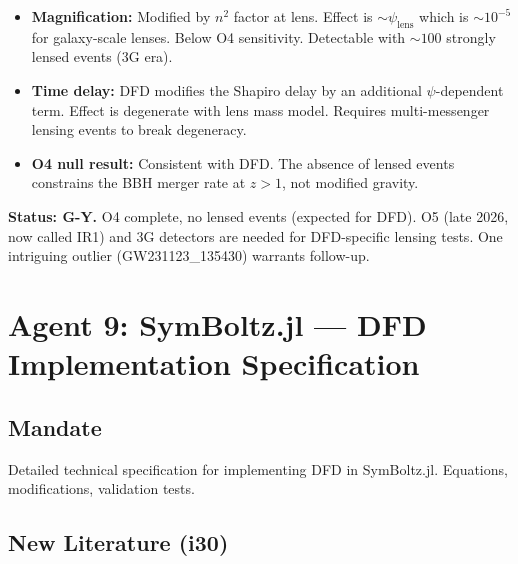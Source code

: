 \documentclass[11pt,a4paper]{article}
\newcommand{\GY}{\textcolor{dfdgy}{\textbf{G-Y}}}
\begin{document}
\begin{itemize}
\item \textbf{Magnification:} Modified by $n^2$ factor at lens. Effect is $\sim \psi_\mathrm{lens}$ which is $\sim 10^{-5}$ for galaxy-scale lenses. Below O4 sensitivity. Detectable with $\sim 100$ strongly lensed events (3G era).
\item \textbf{Time delay:} DFD modifies the Shapiro delay by an additional $\psi$-dependent term. Effect is degenerate with lens mass model. Requires multi-messenger lensing events to break degeneracy.
\item \textbf{O4 null result:} Consistent with DFD. The absence of lensed events constrains the BBH merger rate at $z > 1$, not modified gravity.
\end{itemize}

\textbf{Status: \GY.} O4 complete, no lensed events (expected for DFD). O5 (late 2026, now called IR1) and 3G detectors are needed for DFD-specific lensing tests. One intriguing outlier (GW231123\_135430) warrants follow-up.

\section{Agent 9: SymBoltz.jl --- DFD Implementation Specification}

\subsection{Mandate}
Detailed technical specification for implementing DFD in SymBoltz.jl. Equations, modifications, validation tests.

\subsection{New Literature (i30)}
\end{document}
